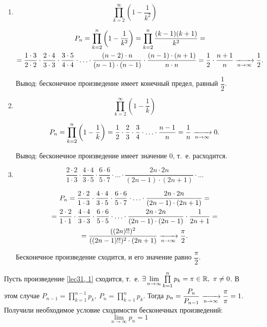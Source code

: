 \documentclass[../../main.tex]{subfiles}
\begin{document}
	\begin{examples}
		
		\;
		
		\begin{enumerate}[label=\arabic*)]
			\item \[ \prod\limits_{k = 2}^{\infty} \left(1 - \frac{1}{k^2}\right) \]
			
			\begin{gather*}
			P_n = \prod\limits_{k = 2}^{n} \left(1 - \frac{1}{k^2}\right) = 
			\prod\limits_{k = 2}^{n} \frac{(k - 1)(k + 1)}{k^2} = \\
			= \frac{1 \cdot 3}{2 \cdot 2} \cdot \frac{2 \cdot 4}{3 \cdot 3} \cdot 
			\frac{3 \cdot 5}{4 \cdot 4} \cdot \ldots \cdot \frac{(n - 2) \cdot n}{(n - 
			1) \cdot (n - 1)} \cdot \frac{(n - 1) \cdot (n + 1)}{n \cdot n} = 
			\frac{1}{2} \cdot \frac{n + 1}{n} \xrightarrow[n \to \infty]{} \frac{1}{2}.
			\end{gather*}
			
			Вывод: бесконечное произведение имеет конечный предел, равный 
			$\dfrac{1}{2}$.
			
			\item  \[ \prod\limits_{k = 2}^{\infty} \left(1 - \frac{1}{k}\right) \]
			
			\[P_n = \prod\limits_{k = 2}^{n} \left(1 - \frac{1}{k}\right) = \frac{1}{2} 
			\cdot \frac{2}{3} \cdot \frac{3}{4} \cdot \ldots \cdot \frac{n - 1}{n} = 
			\frac{1}{n} \xrightarrow[n \to \infty]{} 0.\]
			
			Вывод: бесконечное произведение имеет 
			значение $0$, т.~е. расходится.
			
			\item \[ \frac{2 \cdot 2}{1 \cdot 3} \cdot \frac{4 \cdot 4}{3 \cdot 5} 
			\cdot \frac{6 \cdot 6}{5 \cdot 7} \cdot \ldots \cdot \frac{2n \cdot 2n}{(2n 
			- 1) \cdot (2n + 1)} \cdot \ldots\]
			
			\begin{gather*}
			P_n =
			\frac{2 \cdot 2}{1 \cdot 3} \cdot \frac{4 \cdot 4}{3 
			\cdot 5} \cdot \frac{6 \cdot 6}{5 \cdot 7} \cdot \ldots \cdot \frac{2n 
			\cdot 2n}{(2n - 1) \cdot (2n + 1)} = \\
			= \frac{2 \cdot 2}{1 \cdot 1} \cdot \frac{4 \cdot 4}{3 \cdot 3} 
			\cdot \frac{6 \cdot 6}{5 \cdot 5} \cdot \ldots \cdot \frac{2n \cdot 2n}{(2n 
			- 1) \cdot (2n - 1)} \cdot \frac1{2n+1} = \\
			= \frac{((2n)!!)^2}{((2n - 1)!!)^2 \cdot (2n + 1)} \xrightarrow[n \to \infty]{} 
			\frac{\pi}{2}.
			\end{gather*}
			
			Бесконечное произведение сходится, и его значение равно $\dfrac{\pi}{2}$.
		\end{enumerate}
	\end{examples}
	Пусть произведение \eqref{lec31, 1} сходится, т.~е. $\exists \lim\limits_{n \to \infty} 
	\prod\limits_{k = 1}^{n} p_k = \pi \in \mathbb{R},\ \pi \neq 0$. В этом случае $P_{n 
	- 1} = \prod\limits_{k = 1}^{n - 1}p_k,\ P_{n} = \prod\limits_{k = 
	1}^{n}p_k$. Тогда $p_n = \dfrac{P_n}{P_{n - 1}} \xrightarrow[n \to \infty]{} 
	\dfrac{\pi}{\pi} = 1$. Получили необходимое условие сходимости бесконечных 
	произведений:
	\[\boxed{\lim_{n\to\infty} p_n = 1}\]
		
\end{document}
